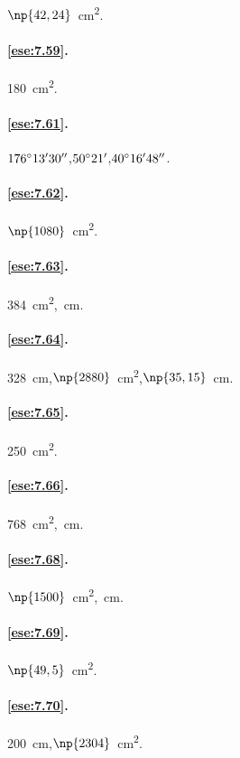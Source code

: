 $\np{42,24}$~cm\textsuperscript{2}.

\paragraph{\ref{ese:7.59}.}
180~cm\textsuperscript{2}.

\paragraph{\ref{ese:7.61}.}
$176{}^{\circ}13'30''$,\quad $50{}^{\circ}21'$,\quad $40{}^{\circ}16'48''$.

\paragraph{\ref{ese:7.62}.}
$\np{1080}$~cm\textsuperscript{2}.

\paragraph{\ref{ese:7.63}.}
384~cm\textsuperscript{2},~cm.

\paragraph{\ref{ese:7.64}.}
328~cm,\quad $\np{2880}$~cm\textsuperscript{2},\quad $\np{35,15}$~cm.

\paragraph{\ref{ese:7.65}.}
250~cm\textsuperscript{2}.

\paragraph{\ref{ese:7.66}.}
768~cm\textsuperscript{2},~cm.

\paragraph{\ref{ese:7.68}.}
$\np{1500}$~cm\textsuperscript{2},~cm.

\paragraph{\ref{ese:7.69}.}
$\np{49,5}$~cm\textsuperscript{2}.

\paragraph{\ref{ese:7.70}.}
200~cm,\quad $\np{2304}$~cm\textsuperscript{2}.

